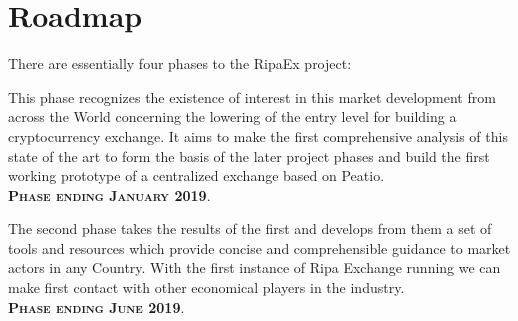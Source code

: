 \documentclass[11pt,fleqn]{book} %
\begin{document}
\section{Roadmap}
There are essentially four phases to the RipaEx project:
\begin{center}
	\begin{tcolorbox}[roadmapBox,
		title=\textbf{\textsc{Funding the project: XPX PreSale and RIPA TEC (WP2)}}]

		This phase recognizes the existence of interest in this market development
		from across the World concerning the lowering of the entry level for building a cryptocurrency exchange.
		It aims to make the first comprehensive analysis of this state of the art to form the basis of the later project phases and
		build the first working prototype of a centralized exchange based on Peatio.\\
		\vspace{1cm}
		\centering\textbf{\textsc{Phase ending January 2019}}.
	\end{tcolorbox}
	\resizebox{0.05\textwidth}{26pt}{$\Downarrow$}
	\begin{tcolorbox}[roadmapBox,
		title=\textbf{\textsc{First exchange opening and development of tools and resources (WP3)}}]

		The second phase takes the results of the first 
		and develops from them a set of tools and resources which provide concise and comprehensible guidance to market actors in any
		Country. With the first instance of Ripa Exchange running we can make first contact with other economical players in the industry.\\
		\vspace{1cm}
		\centering\textbf{\textsc{Phase ending June 2019}}.
	\end{tcolorbox}
	\resizebox{0.05\textwidth}{26pt}{$\Downarrow$}
	\begin{tcolorbox}[roadmapBox,
		title=\textbf{\textsc{Dissemination (WP 7/8) and Project Coordination (WP1)}}]


\end{tcolorbox}
\end{center}
\end{document}
